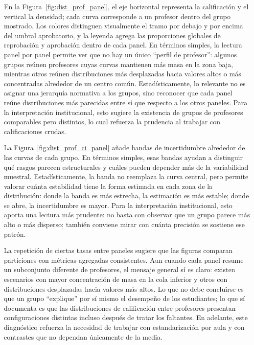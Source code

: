 \documentclass[10pt,letterpaper]{article} %
\numberwithin{figure}{subsection}
\begin{document}
En la Figura~\ref{fig:dist_prof_panel}, el eje horizontal representa la calificación y el vertical la densidad; cada curva corresponde a un profesor dentro del grupo mostrado. Los colores distinguen visualmente el tramo por debajo y por encima del umbral aprobatorio, y la leyenda agrega las proporciones globales de reprobación y aprobación dentro de cada panel. En términos simples, la lectura panel por panel permite ver que no hay un único ``perfil de profesor'': algunos grupos reúnen profesores cuyas curvas mantienen más masa en la zona baja, mientras otros reúnen distribuciones más desplazadas hacia valores altos o más concentradas alrededor de un centro común. Estadísticamente, lo relevante no es asignar una jerarquía normativa a los grupos, sino reconocer que cada panel reúne distribuciones más parecidas entre sí que respecto a los otros paneles. Para la interpretación institucional, esto sugiere la existencia de grupos de profesores comparables pero distintos, lo cual refuerza la prudencia al trabajar con calificaciones crudas.

La Figura~\ref{fig:dist_prof_ci_panel} añade bandas de incertidumbre alrededor de las curvas de cada grupo. En términos simples, esas bandas ayudan a distinguir qué rasgos parecen estructurales y cuáles pueden depender más de la variabilidad muestral. Estadísticamente, la banda no reemplaza la curva central, pero permite valorar cuánta estabilidad tiene la forma estimada en cada zona de la distribución: donde la banda es más estrecha, la estimación es más estable; donde se abre, la incertidumbre es mayor. Para la interpretación institucional, esto aporta una lectura más prudente: no basta con observar que un grupo parece más alto o más disperso; también conviene mirar con cuánta precisión se sostiene ese patrón.

La repetición de ciertas tasas entre paneles sugiere que las figuras comparan particiones con métricas agregadas consistentes. Aun cuando cada panel resume un subconjunto diferente de profesores, el mensaje general sí es claro: existen escenarios con mayor concentración de masa en la cola inferior y otros con distribuciones desplazadas hacia valores más altos. Lo que no debe concluirse es que un grupo ``explique'' por sí mismo el desempeño de los estudiantes; lo que sí documenta es que las distribuciones de calificación entre profesores presentan configuraciones distintas incluso después de tratar los faltantes. En adelante, este diagnóstico refuerza la necesidad de trabajar con estandarización por aula y con contrastes que no dependan únicamente de la media.
\end{document}
